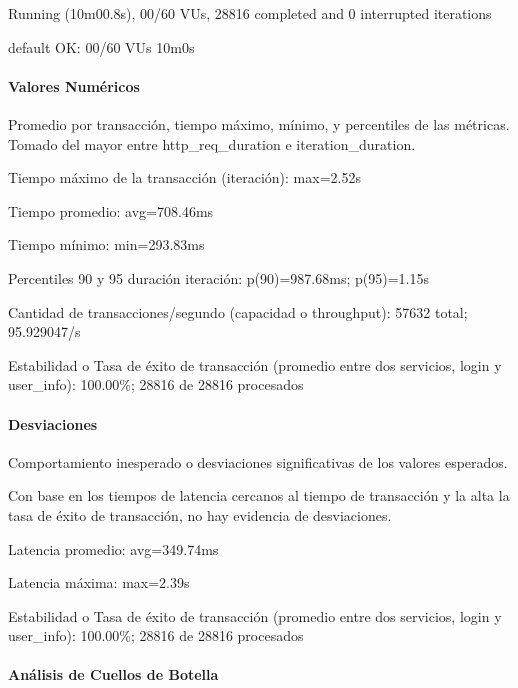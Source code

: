\documentclass[
  paper=a4,
  ,captions=tableheading
]{scrartcl}
\renewenvironment{quote}{\begin{customblockquote}\list{}{\rightmargin=0em\leftmargin=0em}%
\item\relax\color{blockquote-text}\ignorespaces}{\unskip\unskip\endlist\end{customblockquote}}
\begin{document}
\begin{quote}
Running (10m00.8s), 00/60 VUs, 28816 completed and 0 interrupted
iterations

default OK: 00/60 VUs 10m0s
\end{quote}

\paragraph{Valores Numéricos}\label{sec:valores-numuxe9ricos}

Promedio por transacción, tiempo máximo, mínimo, y percentiles de las
métricas. Tomado del mayor entre http\_req\_duration e
iteration\_duration.

\begin{quote}
Tiempo máximo de la transacción (iteración): max=2.52s

Tiempo promedio: avg=708.46ms

Tiempo mínimo: min=293.83ms

Percentiles 90 y 95 duración iteración: p(90)=987.68ms; p(95)=1.15s

Cantidad de transacciones/segundo (capacidad o throughput): 57632 total;
95.929047/s

Estabilidad o Tasa de éxito de transacción (promedio entre dos
servicios, login y user\_info): 100.00\%; 28816 de 28816 procesados
\end{quote}

\paragraph{Desviaciones}\label{sec:desviaciones}

Comportamiento inesperado o desviaciones significativas de los valores
esperados.

Con base en los tiempos de latencia cercanos al tiempo de transacción y
la alta la tasa de éxito de transacción, no hay evidencia de
desviaciones.

\begin{quote}
Latencia promedio: avg=349.74ms

Latencia máxima: max=2.39s

Estabilidad o Tasa de éxito de transacción (promedio entre dos
servicios, login y user\_info): 100.00\%; 28816 de 28816 procesados
\end{quote}

\paragraph{Análisis de Cuellos de
Botella}\label{sec:anuxe1lisis-de-cuellos-de-botella}
\end{document}
